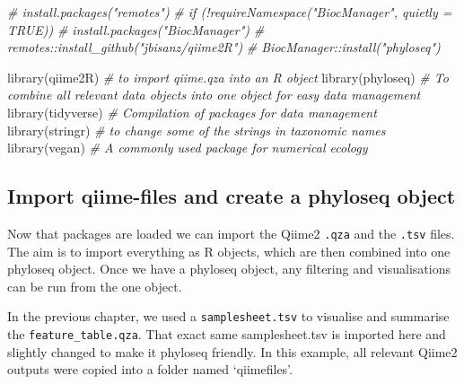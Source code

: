 \documentclass[
]{book}
\newenvironment{Shaded}{\begin{snugshade}}{\end{snugshade}}
\newcommand{\CommentTok}[1]{\textcolor[rgb]{0.56,0.35,0.01}{\textit{#1}}}
\newcommand{\FunctionTok}[1]{\textcolor[rgb]{0.00,0.00,0.00}{#1}}
\newcommand{\NormalTok}[1]{#1}
\begin{document}
\begin{Shaded}
\begin{Highlighting}[]
\CommentTok{\# install.packages("remotes")}
\CommentTok{\# if (!requireNamespace("BiocManager", quietly = TRUE))}
\CommentTok{\#  install.packages("BiocManager")}
\CommentTok{\# remotes::install\_github("jbisanz/qiime2R")}
\CommentTok{\# BiocManager::install("phyloseq")}

\FunctionTok{library}\NormalTok{(qiime2R)  }\CommentTok{\# to import qiime.qza into an R object}
\FunctionTok{library}\NormalTok{(phyloseq) }\CommentTok{\# To combine all relevant data objects into one object for easy data management}
\FunctionTok{library}\NormalTok{(tidyverse) }\CommentTok{\# Compilation of packages for data management }
\FunctionTok{library}\NormalTok{(stringr)  }\CommentTok{\# to change some of the strings in taxonomic names }
\FunctionTok{library}\NormalTok{(vegan)   }\CommentTok{\# A commonly used package for numerical ecology}
\end{Highlighting}
\end{Shaded}

\hfill\break

\hypertarget{import-qiime-files-and-create-a-phyloseq-object}{%
\subsection{Import qiime-files and create a phyloseq object}\label{import-qiime-files-and-create-a-phyloseq-object}}

Now that packages are loaded we can import the Qiime2 \texttt{.qza} and the \texttt{.tsv} files. The aim is to import everything as R objects, which are then combined into one phyloseq object. Once we have a phyloseq object, any filtering and visualisations can be run from the one object.

In the previous chapter, we used a \texttt{samplesheet.tsv} to visualise and summarise the \texttt{feature\_table.qza}. That exact same samplesheet.tsv is imported here and slightly changed to make it phyloseq friendly. In this example, all relevant Qiime2 outputs were copied into a folder named `qiimefiles'.
\end{document}

